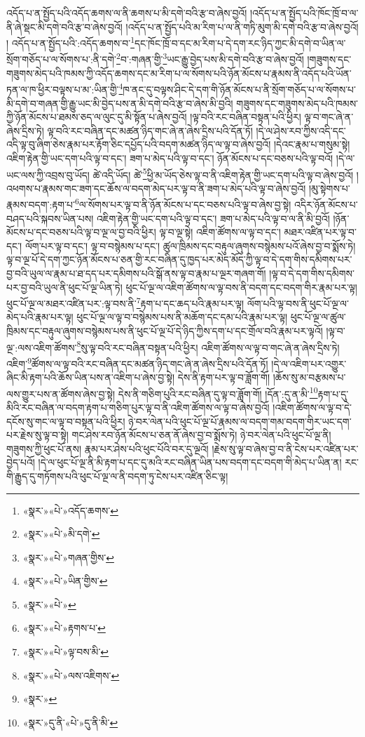 འདོད་པ་ན་སྤྱོད་པའི་འདོད་ཆགས་ལ་ནི་ཆགས་པ་མི་དགེ་བའི་རྩ་བ་ཞེས་བྱའོ། །འདོད་པ་ན་སྤྱོད་པའི་ཁོང་ཁྲོ་བ་ལ་ནི་ཞེ་སྡང་མི་དགེ་བའི་རྩ་བ་ཞེས་བྱའོ། །འདོད་པ་ན་སྤྱོད་པའི་མ་རིག་པ་ལ་ནི་གཏི་མུག་མི་དགེ་བའི་རྩ་བ་ཞེས་བྱའོ། །
འདོད་པ་ན་སྤྱོད་པའི་:འདོད་ཆགས་བ་\footnote{«སྣར་»«པེ་»འདོད་ཆགས་}དང་ཁོང་ཁྲོ་བ་དང་མ་རིག་པ་དེ་དག་རང་ཉིད་ཀྱང་མི་དགེ་བ་ཡིན་ལ་སྲོག་གཅོད་པ་ལ་སོགས་པ་:ནི་དགེ་\footnote{«སྣར་»«པེ་»མི་དགེ་}བ་:གཞན་གྱི་\footnote{«སྣར་»«པེ་»གཞན་གྱིས་}ཡང་རྒྱུ་བྱེད་པས་མི་དགེ་བའི་རྩ་བ་ཞེས་བྱའོ། །གཟུགས་དང་གཟུགས་མེད་པའི་ཁམས་ཀྱི་འདོད་ཆགས་དང་མ་རིག་པ་ལ་སོགས་པའི་ཉོན་མོངས་པ་རྣམས་ནི་འདོད་པའི་ཡོན་ཏན་ལ་ཁ་ཕྱིར་བལྟས་པ་མ་:ཡིན་གྱི་\footnote{«སྣར་»«པེ་»ཡིན་གྱིས་}ཁ་ནང་དུ་བལྟས་ཤིང་དེ་དག་གི་ཉོན་མོངས་པ་ནི་སྲོག་གཅོད་པ་ལ་སོགས་པ་མི་དགེ་བ་གཞན་གྱི་རྒྱུ་ཡང་མི་བྱེད་པས་ན་མི་དགེ་བའི་རྩ་བ་ཞེས་མི་བྱའི། གཟུགས་དང་གཟུགས་མེད་པའི་ཁམས་ཀྱི་ཉོན་མོངས་པ་ཐམས་ཅད་ལ་ལུང་དུ་མི་སྟོན་པ་ཞེས་བྱའོ། །ལྟ་བའི་རང་བཞིན་བསྟན་པའི་ཕྱིར། ལྟ་བ་གང་ཞེ་ན་ཞེས་དྲིས་ཏེ། ལྟ་བའི་རང་བཞིན་དང་མཚན་ཉིད་གང་ཞེ་ན་ཞེས་དྲིས་པའི་དོན་ཏོ། །དེ་ལ་ཤེས་རབ་ཀྱིས་འདི་དང་འདི་ལྟ་བུ་ཞིག་ཅེས་རྣམ་པར་རྟོག་ཅིང་དཔྱོད་པའི་བདག་མཚན་ཉིད་ལ་ལྟ་བ་ཞེས་བྱའོ། །དེའང་རྣམ་པ་གསུམ་སྟེ། འཇིག་རྟེན་གྱི་ཡང་དག་པའི་ལྟ་བ་དང་། ཟག་པ་མེད་པའི་ལྟ་བ་དང་། ཉོན་མོངས་པ་དང་བཅས་པའི་ལྟ་བའོ། །དེ་ལ་ཡང་ལས་ཀྱི་འབྲས་བུ་ཡོད། ཚེ་འདི་ཡོད། ཚེ་\footnote{«སྣར་»«པེ་»}ཕྱི་མ་ཡོད་ཅེས་ལྟ་བ་ནི་འཇིག་རྟེན་གྱི་ཡང་དག་པའི་ལྟ་བ་ཞེས་བྱའོ། །འཕགས་པ་རྣམས་གང་ཟག་དང་ཆོས་ལ་བདག་མེད་པར་ལྟ་བ་ནི་ཟག་པ་མེད་པའི་ལྟ་བ་ཞེས་བྱའོ། །མུ་སྟེགས་པ་རྣམས་བདག་:རྟག་པ་\footnote{«སྣར་»«པེ་»རྟགས་པ་}ལ་སོགས་པར་ལྟ་བ་ནི་ཉོན་མོངས་པ་དང་བཅས་པའི་ལྟ་བ་ཞེས་བྱ་སྟེ། འདིར་ཉོན་མོངས་པ་བཤད་པའི་སྐབས་ཡིན་པས། འཇིག་རྟེན་གྱི་ཡང་དག་པའི་ལྟ་བ་དང་། ཟག་པ་མེད་པའི་ལྟ་བ་ལ་ནི་མི་བྱའོ། །ཉོན་མོངས་པ་དང་བཅས་པའི་ལྟ་བ་ལྔ་ལ་བྱ་བའི་ཕྱིར། ལྟ་བ་ལྔ་སྟེ། འཇིག་ཚོགས་ལ་ལྟ་བ་དང་། མཐར་འཛིན་པར་ལྟ་བ་དང་། ལོག་པར་ལྟ་བ་དང་། ལྟ་བ་བསྙེམས་པ་དང་། ཚུལ་ཁྲིམས་དང་བརྟུལ་ཞུགས་བསྙེམས་པའོ་ཞེས་བྱ་བ་སྨོས་ཏེ། ལྟ་བ་ལྔ་པོ་དེ་དག་ཀྱང་ཉོན་མོངས་པ་ཅན་གྱི་རང་བཞིན་དུ་ཁྱད་པར་མེད་མོད་ཀྱི་ལྟ་བ་དེ་དག་གིས་དམིགས་པར་བྱ་བའི་ཡུལ་ལ་རྣམ་པ་ཐ་དད་པར་དམིགས་པའི་སྒོ་ནས་ལྟ་བ་རྣམ་པ་ལྔར་གཞག་གོ། །ལྟ་བ་དེ་དག་གིས་དམིགས་པར་བྱ་བའི་ཡུལ་ནི་ཕུང་པོ་ལྔ་ཡིན་ཏེ། ཕུང་པོ་ལྔ་ལ་འཇིག་ཚོགས་ལ་ལྟ་བས་ནི་བདག་དང་བདག་གིར་རྣམ་པར་ལྟ། ཕུང་པོ་ལྔ་ལ་མཐར་འཛིན་པར་:ལྟ་བས་ནི་\footnote{«སྣར་»«པེ་»ལྟ་བས་མི་}རྟག་པ་དང་ཆད་པའི་རྣམ་པར་ལྟ། ལོག་པའི་ལྟ་བས་ནི་ཕུང་པོ་ལྔ་ལ་མེད་པའི་རྣམ་པར་ལྟ། ཕུང་པོ་ལྔ་ལ་ལྟ་བ་བསྙེམས་པས་ནི་མཆོག་དང་དམ་པའི་རྣམ་པར་ལྟ། ཕུང་པོ་ལྔ་ལ་ཚུལ་ཁྲིམས་དང་བརྟུལ་ཞུགས་བསྙེམས་པས་ནི་ཕུང་པོ་ལྔ་པོ་དེ་ཉིད་ཀྱིས་དག་པ་དང་གྲོལ་བའི་རྣམ་པར་ལྟའོ། །ལྟ་བ་ལྔ་:ལས་འཇིག་ཚོགས་\footnote{«སྣར་»«པེ་»ལས་འཇིགས་}སུ་ལྟ་བའི་རང་བཞིན་བསྟན་པའི་ཕྱིར། འཇིག་ཚོགས་ལ་ལྟ་བ་གང་ཞེ་ན་ཞེས་དྲིས་ཏེ། འཇིག་\footnote{«སྣར་»}ཚོགས་ལ་ལྟ་བའི་རང་བཞིན་དང་མཚན་ཉིད་གང་ཞེ་ན་ཞེས་དྲིས་པའི་དོན་ཏོ། །དེ་ལ་འཇིག་པར་འགྱུར་ཞིང་མི་རྟག་པའི་ཆོས་ཡིན་པས་ན་འཇིག་པ་ཞེས་བྱ་སྟེ། དེས་ནི་རྟག་པར་ལྟ་བ་ཟློག་གོ། །ཆོས་སུ་མ་བརྩམས་པ་ལས་གྱུར་པས་ན་ཚོགས་ཞེས་བྱ་སྟེ། དེས་ནི་གཅིག་པུའི་རང་བཞིན་དུ་ལྟ་བ་ཟློག་གོ། །དོན་:དུ་ན་མི་\footnote{«སྣར་»དུ་ནི་«པེ་»དུ་ནི་མི་}རྟག་པ་དུ་མིའི་རང་བཞིན་ལ་བདག་རྟག་པ་གཅིག་པུར་ལྟ་བ་ནི་འཇིག་ཚོགས་ལ་ལྟ་བ་ཞེས་བྱའོ། །འཇིག་ཚོགས་ལ་ལྟ་བ་དེ་དངོས་སུ་གང་ལ་ལྟ་བ་བསྟན་པའི་ཕྱིར། ཉེ་བར་ལེན་པའི་ཕུང་པོ་ལྔ་པོ་རྣམས་ལ་བདག་གམ་བདག་གིར་ཡང་དག་པར་རྗེས་སུ་ལྟ་བ་སྟེ། གང་ཤེས་རབ་ཉོན་མོངས་པ་ཅན་ནོ་ཞེས་བྱ་བ་སྨོས་ཏེ། ཉེ་བར་ལེན་པའི་ཕུང་པོ་ལྔ་ནི། གཟུགས་ཀྱི་ཕུང་པོ་ནས། རྣམ་པར་ཤེས་པའི་ཕུང་པོའི་བར་དུ་ལྔའོ། །རྗེས་སུ་ལྟ་བ་ཞེས་བྱ་བ་ནི་ངེས་པར་འཛིན་པར་བྱེད་པའོ། །དེ་ལ་ཕུང་པོ་ལྔ་ནི་མི་རྟག་པ་དང་དུ་མའི་རང་བཞིན་ཡིན་པས་བདག་དང་བདག་གི་མེད་པ་ཡིན་ན། རང་གི་རྒྱུད་དུ་གཏོགས་པའི་ཕུང་པོ་ལྔ་ལ་ནི་བདག་ཏུ་ངེས་པར་འཛིན་ཅིང་ལྟ། 